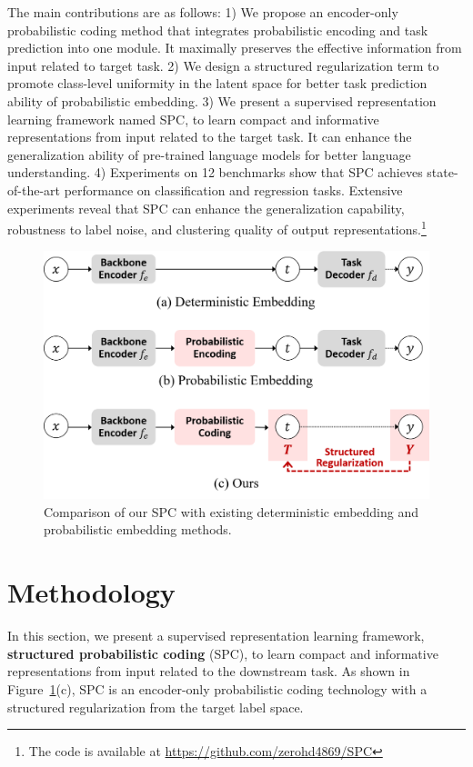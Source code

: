\documentclass[letterpaper]{article} %
\begin{document}
The main contributions are as follows:    
    1) We propose an encoder-only probabilistic coding method that integrates probabilistic encoding and task prediction into one module. It maximally preserves the effective information from input related to target task.
    2) We design a structured regularization term to promote class-level uniformity in the latent space for better task prediction ability of probabilistic embedding.
    3)  We present a supervised representation learning framework named SPC, to learn compact and informative representations from input related to the target task. It can enhance the generalization ability of pre-trained language models for better language understanding.
    4) Experiments on 12 benchmarks show that SPC achieves state-of-the-art performance on classification and regression tasks. Extensive experiments reveal that SPC can enhance the generalization capability, robustness to label noise, and clustering quality of output representations.\footnote{The code is available at \url{https://github.com/zerohd4869/SPC}}


\begin{figure}[t]
\centering
\includegraphics[width=0.82\columnwidth]{figures/intro_t.png}  
\caption{Comparison of our SPC with existing deterministic embedding and probabilistic embedding methods.}
\label{fig1}
\end{figure}

\section{Methodology}
In this section, we present a supervised representation learning framework, \textbf{structured probabilistic coding} (SPC), to learn compact and informative representations from input related to the downstream task. 
As shown in Figure~\ref{fig1}(c), SPC is an encoder-only probabilistic coding technology with a structured regularization from the target label space. 
\end{document}
